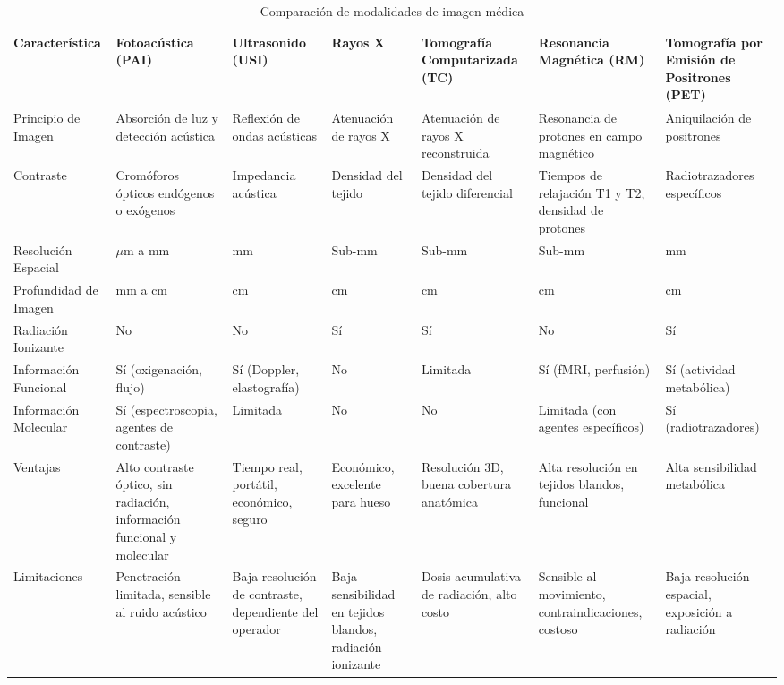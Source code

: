 \begin{table}[htbp]
\centering
\caption{Comparación de modalidades de imagen médica}
\label{tab:comparacion}
\small
\renewcommand{\arraystretch}{1.4}
\setlength{\tabcolsep}{3pt}
\begin{tabular}{>{\raggedright\arraybackslash}p{3.5cm}
                >{\raggedright\arraybackslash}p{2.5cm}
                >{\raggedright\arraybackslash}p{2.3cm}
                >{\raggedright\arraybackslash}p{1.8cm}
                >{\raggedright\arraybackslash}p{2.2cm}
                >{\raggedright\arraybackslash}p{2.2cm}
                >{\raggedright\arraybackslash}p{2.3cm}}
\toprule
\textbf{Característica} & \textbf{Fotoacústica (PAI)} & \textbf{Ultrasonido (USI)} & \textbf{Rayos X} & \textbf{Tomografía Computarizada (TC)} & \textbf{Resonancia Magnética (RM)} & \textbf{Tomografía por Emisión de Positrones (PET)} \\
\midrule
Principio de Imagen & Absorción de luz y detección acústica & Reflexión de ondas acústicas & Atenuación de rayos X & Atenuación de rayos X reconstruida & Resonancia de protones en campo magnético & Aniquilación de positrones \\
\midrule
Contraste & Cromóforos ópticos endógenos o exógenos & Impedancia acústica & Densidad del tejido & Densidad del tejido diferencial & Tiempos de relajación T1 y T2, densidad de protones & Radiotrazadores específicos \\
\midrule
Resolución Espacial & \(\mu\)m a mm & mm & Sub-mm & Sub-mm & Sub-mm & mm \\
\midrule
Profundidad de Imagen & mm a cm & cm & cm & cm & cm & cm \\
\midrule
Radiación Ionizante & No & No & Sí & Sí & No & Sí \\
\midrule
Información Funcional & Sí (oxigenación, flujo) & Sí (Doppler, elastografía) & No & Limitada & Sí (fMRI, perfusión) & Sí (actividad metabólica) \\
\midrule
Información Molecular & Sí (espectroscopia, agentes de contraste) & Limitada & No & No & Limitada (con agentes específicos) & Sí (radiotrazadores) \\
\midrule
Ventajas & Alto contraste óptico, sin radiación, información funcional y molecular & Tiempo real, portátil, económico, seguro & Económico, excelente para hueso & Resolución 3D, buena cobertura anatómica & Alta resolución en tejidos blandos, funcional & Alta sensibilidad metabólica \\
\midrule
Limitaciones & Penetración limitada, sensible al ruido acústico & Baja resolución de contraste, dependiente del operador & Baja sensibilidad en tejidos blandos, radiación ionizante & Dosis acumulativa de radiación, alto costo & Sensible al movimiento, contraindicaciones, costoso & Baja resolución espacial, exposición a radiación \\
\bottomrule
\end{tabular}
\end{table}



